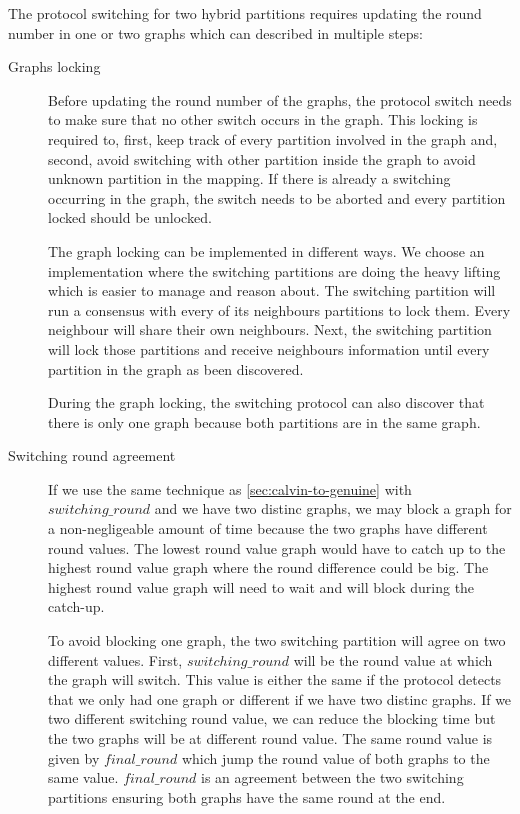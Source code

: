 \documentclass[a4paper, 10pt]{article}
\newcommand{\Li}[1]{\mynote{Li}{#1}{blue}}
\begin{document}
The protocol switching for two hybrid partitions requires updating the round number in one or two graphs
which can described in multiple steps:

\begin{description}
    \item[Graphs locking] Before updating the round number of the graphs, the protocol switch needs to make
        sure that no other switch occurs in the graph. This locking is required to, first, keep track of
        every partition involved in the graph and,
        second, avoid switching with other partition inside the graph
        to avoid unknown partition in the mapping. If there is already a switching occurring in the graph,
        the switch needs to be aborted and every partition locked should be unlocked.

        The graph locking can be implemented in different ways. We choose an implementation where the switching
        partitions are doing the heavy lifting which is easier to manage and reason about.
        The switching partition will run a consensus with every of its neighbours partitions to lock them. Every neighbour will share their
        own neighbours. Next, the switching partition will lock those partitions and receive neighbours information until
        every partition in the graph as been discovered.

        During the graph locking, the switching protocol can also discover that there is only one graph because both
        partitions are in the same graph.

   \item[Switching round agreement] If we use the same technique as \ref{sec:calvin-to-genuine} with $switching\_round$
       and we have two distinc graphs, we may block a graph for a non-negligeable amount of time because the two graphs have different
       round values. The lowest round value graph would have to catch up to the highest round value graph where the round difference could be
       big. The highest round value graph will need to wait and will block during the catch-up.

       To avoid blocking one graph, the two switching partition will agree on two different values. First, $switching\_round$
       will be the round value at which the graph will switch. This value is either the same if the protocol detects that we only
       had one graph or different if we have two distinc graphs. If we two different switching round value, we can reduce the
       blocking time but the two graphs will be at different round value. The same round value is given by $final\_round$ which
       jump the round value of both graphs to the same value. $final\_round$ is an agreement between the two switching partitions
       ensuring both graphs have the same round at the end.


\end{description}
\end{document}
